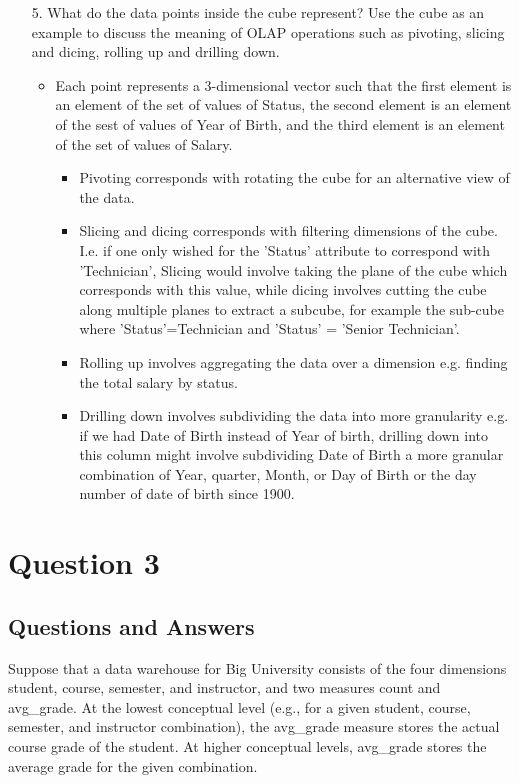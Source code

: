\documentclass{scrreprt}
\begin{document}
\begin{enumerate}
	\item[5.] What do the data points inside the cube represent? Use the cube as an example to discuss the meaning of OLAP operations such as pivoting, slicing and dicing, rolling up and drilling down.
\begin{itemize}
	\item Each point represents a 3-dimensional vector such that the first element is an element of the set of values of Status, the second element is an element of the sest of values of Year of Birth, and the third element is an element of the set of values of Salary.
	\begin{itemize}
		\item Pivoting corresponds with rotating the cube for an alternative view of the data.
		\item Slicing and dicing corresponds with filtering dimensions of the cube. I.e. if one only wished for  the 'Status' attribute to correspond with 'Technician', Slicing would involve taking the plane of the cube which corresponds with this value, while dicing involves cutting the cube along multiple planes to extract a subcube, for example the sub-cube where 'Status'=Technician and 'Status' = 'Senior Technician'.
		\item Rolling up involves aggregating the data over a dimension e.g. finding the total salary by status.
		\item Drilling down involves subdividing the data into more granularity e.g. if we had Date of Birth instead of Year of birth, drilling down into this column might involve subdividing Date of Birth a more granular combination of Year, quarter, Month, or Day of Birth or the day number of date of birth  since 1900.
	\end{itemize}
\end{itemize}

\end{enumerate}

\newpage
\chapter{Question 3}
\section{Questions and Answers}

Suppose that a data warehouse for Big University consists of the four dimensions student, course, semester, and instructor, and two measures count and avg\_grade. At the lowest conceptual level (e.g., for a given student, course, semester, and instructor combination), the avg\_grade measure stores the actual course grade of the student. At higher conceptual levels, avg\_grade stores the average grade for the given combination.
\end{document}
